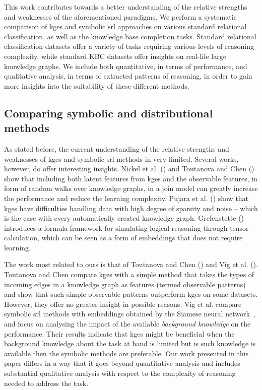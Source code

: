 This work contributes towards a better understanding of the relative strengths and weaknesses of the aforementioned paradigms.
We perform a systematic comparison of \gls{kge}s and symbolic \gls{srl} approaches on various standard relational classification, as well as the knowledge base completion tasks.
Standard relational classification datasets offer a variety of tasks requiring various levels of reasoning complexity, while standard KBC datasets offer insights on real-life large knowledge graphs.
We include both quantitative, in terms of performance, and qualitative analysis, in terms of extracted patterns of reasoning, in order to gain more insights into the suitability of these different methods.









\subsection{Comparing symbolic and distributional methods}


As stated before, the current understanding of the relative strengths and weaknesses of \gls{kge}s and symbolic \gls{srl} methods in very limited.
Several works, however, do offer interesting insights.
Nickel et al. (\cite{NickleNIPS2014}) and Toutanova and Chen (\cite{toutanova2015observed}) show that including both latent features from \gls{kge}s and the observable features, in form of random walks over knowledge graphs, in a join model can greatly increase the performance and reduce the learning complexity.
Pujara et al. (\cite{pujara:emnlp17}) show that \gls{kge}s have difficulties handling data with high degree of sparsity and noise -- which is the case with every automatically created knowledge graph.
Grefenstette (\cite{GrefenstetteTFDS}) introduces a formula framework for simulating logical reasoning through tensor calculation, which can be seen as a form of embeddings that does not require learning.


The work most related to ours is that of Toutanova and Chen (\cite{toutanova2015observed}) and Vig et al. (\cite{VigILP2017}).
Toutanova and Chen compare \gls{kge}s with a simple method that takes the types of incoming edges in a knowledge graph as features (termed observable patterns) and show that such simple observable patterns outperform \gls{kge}s on some datasets.
However, they offer no greater insight in possible reasons.
Vig et al.  compare symbolic \gls{srl} methods with embeddings obtained by the Siamese neural network~\cite{Bromley:1993:SVU:2987189.2987282}, and focus on analysing the impact of the available \textit{background knowledge} on the performance.
Their results indicate that \gls{kge}s might be beneficial when the background knowledge about the task at hand is limited but is such knowledge is available then the symbolic methods are preferable.
Our work presented in this paper differs in a way that it goes beyond quantitative analysis and includes substantial qualitative analysis with respect to the complexity of reasoning needed to address the task.



